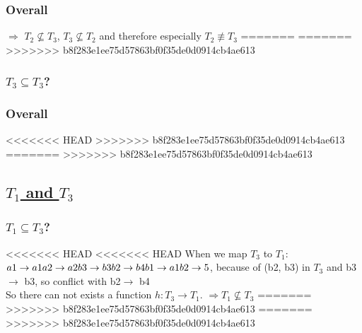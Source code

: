 \documentclass[12pt]{article}
\begin{document}
	\subsubsection*{Overall} %
	$\Rightarrow$ $T_2\not\subseteq T_3$, $T_3 \not\subseteq T_2$ and therefore especially $T_2 \not\equiv T_3$ 
=======
=======
>>>>>>> b8f283e1ee75d57863bf0f35de0d0914cb4ae613
	
	\subsubsection*{$T_3 \subseteq T_3$?} %
%	
	\subsubsection*{Overall} %
<<<<<<< HEAD
>>>>>>> b8f283e1ee75d57863bf0f35de0d0914cb4ae613
=======
>>>>>>> b8f283e1ee75d57863bf0f35de0d0914cb4ae613
	
	\subsection*{\underline{$T_1$ and $T_3$}}
	\subsubsection*{$T_1 \subseteq T_3$?}
<<<<<<< HEAD
<<<<<<< HEAD
When we map $T_3$ to $T_1$:\\
$a1\rightarrow a1\\
a2\rightarrow a2\\
b3\rightarrow b3\\
b2\rightarrow b4\\
b1\rightarrow a1\\
b2\rightarrow 5$, because of (b2, b3) in $T_3$ and b3$\rightarrow$ b3, so conflict with b2$\rightarrow$ b4 \\
So there can not exists a function $h: T_3 \rightarrow T_1$. $\Rightarrow T_1 \not\subseteq T_3$
=======
>>>>>>> b8f283e1ee75d57863bf0f35de0d0914cb4ae613
=======
>>>>>>> b8f283e1ee75d57863bf0f35de0d0914cb4ae613
\end{document}
